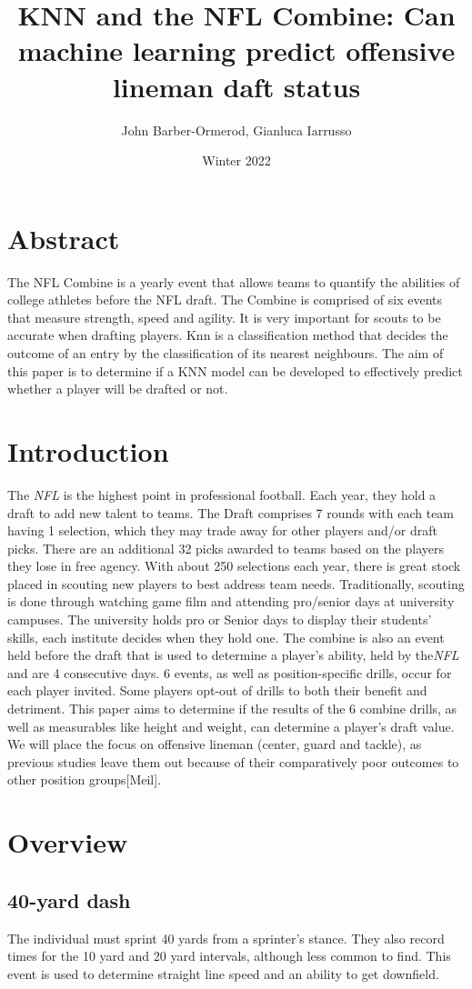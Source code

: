 \documentclass[confrence]{IEEEtran}
\title{KNN and the NFL Combine\texttrademark: Can machine learning predict offensive lineman daft status}
\author{John Barber-Ormerod, Gianluca Iarrusso}
\date{Winter 2022}
\begin{document}
\maketitle
\section*{Abstract}
The NFL Combine is a yearly event that allows teams to quantify the abilities of college athletes before the NFL draft.
The Combine is comprised of six events that measure strength, speed and agility.
It is very important for scouts to be accurate when drafting players.
Knn is a classification method that decides the outcome of an entry by the classification of its nearest neighbours.
The aim of this paper is to determine if a KNN model can be developed to effectively predict whether a player will be drafted or not.
\section*{Introduction}
The \textit{NFL} is the highest point in professional football. Each year, they hold a draft to add new talent to teams.
The Draft comprises 7 rounds with each team having 1 selection,
which they may trade away for other players and/or draft picks.
There are an additional 32 picks awarded to teams based on the players they lose in free agency.
With about 250 selections each year, there is great stock placed in scouting new players to best address team needs.
Traditionally, scouting is done through watching game film and attending pro/senior days at university campuses.
The university holds pro or Senior days to display their students' skills, each institute decides when they hold one.
The combine is also an event held before the draft that is used to determine a player's ability, held by the\textit{NFL} and are 4 consecutive days.
6 events, as well as position-specific drills, occur for each player invited.
Some players opt-out of drills to both their benefit and detriment.
This paper aims to determine if the results of the 6 combine drills, as well as measurables like height and weight, can determine a player's draft value.
We will place the focus on offensive lineman (center, guard and tackle), as previous studies leave them out because of their comparatively poor outcomes to other position groups[Meil].
\section*{Overview}
\subsection*{40-yard dash}
The individual must sprint 40 yards from a sprinter's stance. They also record times for the 10 yard and 20 yard intervals, although less common to find.
This event is used to determine straight line speed and an ability to get downfield.
\end{document}
